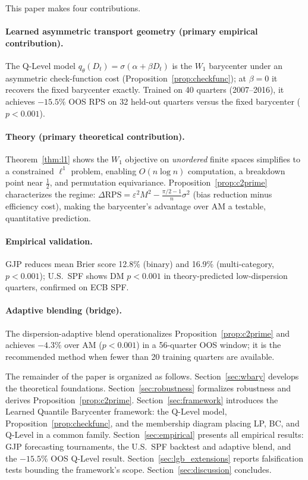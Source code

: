 This paper makes four contributions.

\paragraph{Learned asymmetric transport geometry (primary empirical contribution).}
The Q-Level model $q_\theta(D_t) = \sigma(\alpha + \beta D_t)$ is the $W_1$ barycenter under an asymmetric check-function cost (Proposition~\ref{prop:checkfunc}); at $\beta = 0$ it recovers the fixed barycenter exactly.
Trained on 40 quarters (2007--2016), it achieves $\mathbf{-15.5\%}$ OOS RPS on 32 held-out quarters versus the fixed barycenter ($p < 0.001$).

\paragraph{Theory (primary theoretical contribution).}
Theorem~\ref{thm:l1} shows the $W_1$ objective on \emph{unordered} finite spaces simplifies to a constrained $\ell^1$ problem, enabling $O(n\log n)$ computation, a breakdown point near $\tfrac{1}{2}$, and permutation equivariance.
Proposition~\ref{prop:c2prime} characterizes the regime: $\Delta\mathrm{RPS} = \varepsilon^2 M^2 - \tfrac{\pi/2-1}{n}\sigma^2$ (bias reduction minus efficiency cost), making the barycenter's advantage over AM a testable, quantitative prediction.

\paragraph{Empirical validation.}
GJP reduces mean Brier score 12.8\% (binary) and 16.9\% (multi-category, $p < 0.001$); U.S.\ SPF shows DM $p < 0.001$ in theory-predicted low-dispersion quarters, confirmed on ECB SPF.

\paragraph{Adaptive blending (bridge).}
The dispersion-adaptive blend operationalizes Proposition~\ref{prop:c2prime} and achieves $-4.3\%$ over AM ($p < 0.001$) in a 56-quarter OOS window; it is the recommended method when fewer than 20 training quarters are available.

The remainder of the paper is organized as follows.
Section~\ref{sec:wbary} develops the theoretical foundations.
Section~\ref{sec:robustness} formalizes robustness and derives Proposition~\ref{prop:c2prime}.
Section~\ref{sec:framework} introduces the Learned Quantile Barycenter framework: the Q-Level model, Proposition~\ref{prop:checkfunc}, and the membership diagram placing LP, BC, and Q-Level in a common family.
Section~\ref{sec:empirical} presents all empirical results: GJP forecasting tournaments, the U.S.\ SPF backtest and adaptive blend, and the $-15.5\%$ OOS Q-Level result.
Section~\ref{sec:lgb_extensions} reports falsification tests bounding the framework's scope.
Section~\ref{sec:discussion} concludes.


